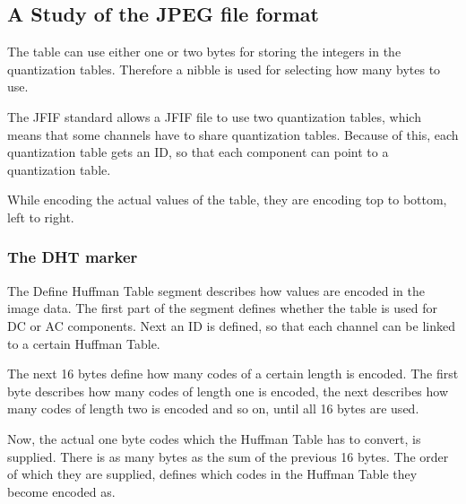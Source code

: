 \begin{infobox}{\section[A Study of the JPEG file format]{A Study of the JPEG file format}}
The table can use either one or two bytes for storing the integers in the quantization tables. Therefore a nibble is used for selecting how many bytes to use.

The JFIF standard allows a JFIF file to use two quantization tables, which means that some channels have to share quantization tables. Because of this, each quantization table gets an ID, so that each component can point to a quantization table. 

While encoding the actual values of the table, they are encoding top to bottom, left to right.


\subsubsection*{The DHT marker}
\begin{centering}
\end{centering}

The Define Huffman Table segment describes how values are encoded in the image data. The first part of the segment defines whether the table is used for DC or AC components. Next an ID is defined, so that each channel can be linked to a certain Huffman Table.

The next 16 bytes define how many codes of a certain length is encoded. The first byte describes how many codes of length one is encoded, the next describes how many codes of length two is encoded and so on, until all 16 bytes are used. 

Now, the actual one byte codes which the Huffman Table has to convert, is supplied. There is as many bytes as the sum of the previous 16 bytes. The order of which they are supplied, defines which codes in the Huffman Table they become encoded as.


\end{infobox}
